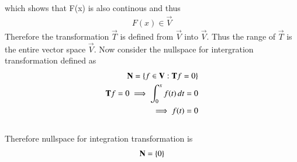 \documentclass[journal,12pt,twocolumn]{IEEEtran}
\begin{document}
\begin{enumerate}[label=\emph{\alph*)}]
which shows that F(x) is also continous and thus
\begin{align}
	F(x) \in \vec{V}
\end{align}
Therefore the transformation $\vec{T}$ is defined from $\vec{V}$ into $\vec{V}$. 
Thus the range of $\vec{T}$ is the entire vector space $\vec{V}$. Now consider the nullspace for 
intergration transformation defined as
\begin{align}
        \mathbf{N}=\left\{f \in \mathbf{V} : \mathbf{T}f=0\right\} \\
        \mathbf{T}f=0 \implies \int_{0}^{x}f(t)\,dt=0  \\
	\implies f(t)=0
\end{align}
\\
Therefore nullspace for integration transformation is
\begin{align}
	\mathbf{N}=\left\{0\right\}
\end{align}	
\end{enumerate}
\end{document}
